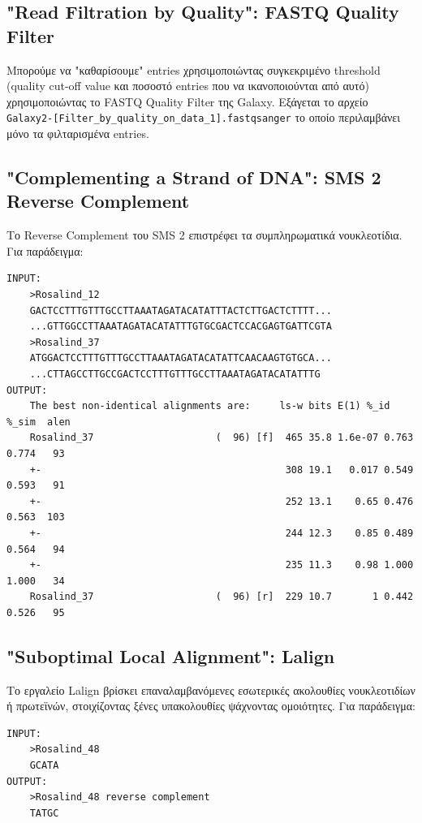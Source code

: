    \subsection{"Read Filtration by Quality": FASTQ Quality Filter}
        Μπορούμε να "καθαρίσουμε" entries χρησιμοποιώντας συγκεκριμένο threshold (quality cut-off value και ποσοστό entries που να ικανοποιούνται από αυτό) χρησιμοποιώντας το FASTQ Quality Filter της Galaxy. \cite{GalaxyFastQQualityFliter}
        Εξάγεται το αρχείο \verb|Galaxy2-[Filter_by_quality_on_data_1].fastqsanger| το οποίο περιλαμβάνει μόνο τα φιλταρισμένα entries.

    \subsection{"Complementing a Strand of DNA": SMS 2 Reverse Complement }
        Το Reverse Complement του SMS 2 επιστρέφει τα συμπληρωματικά νουκλεοτίδια. Για παράδειγμα:
\begin{graycomment} \footnotesize
    \begin{verbatim}
INPUT:
    >Rosalind_12
    GACTCCTTTGTTTGCCTTAAATAGATACATATTTACTCTTGACTCTTTT...
    ...GTTGGCCTTAAATAGATACATATTTGTGCGACTCCACGAGTGATTCGTA
    >Rosalind_37
    ATGGACTCCTTTGTTTGCCTTAAATAGATACATATTCAACAAGTGTGCA...
    ...CTTAGCCTTGCCGACTCCTTTGTTTGCCTTAAATAGATACATATTTG
OUTPUT:
    The best non-identical alignments are:     ls-w bits E(1) %_id  %_sim  alen
    Rosalind_37                     (  96) [f]  465 35.8 1.6e-07 0.763 0.774   93
    +-                                          308 19.1   0.017 0.549 0.593   91
    +-                                          252 13.1    0.65 0.476 0.563  103
    +-                                          244 12.3    0.85 0.489 0.564   94
    +-                                          235 11.3    0.98 1.000 1.000   34
    Rosalind_37                     (  96) [r]  229 10.7       1 0.442 0.526   95\end{verbatim}
\end{graycomment}

    \subsection{"Suboptimal Local Alignment": Lalign}
        Το εργαλείο Lalign \cite{Lalign} βρίσκει επαναλαμβανόμενες εσωτερικές ακολουθίες νουκλεοτιδίων ή πρωτεϊνών, στοιχίζοντας ξένες υπακολουθίες ψάχνοντας ομοιότητες. Για παράδειγμα:
\begin{graycomment} \footnotesize
    \begin{verbatim}
INPUT:
    >Rosalind_48
    GCATA
OUTPUT:
    >Rosalind_48 reverse complement
    TATGC\end{verbatim}
\end{graycomment}


